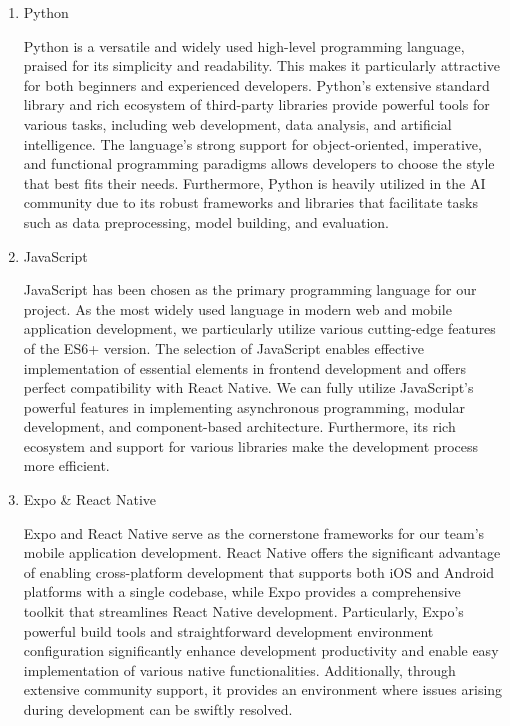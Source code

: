 \documentclass[conference]{IEEEtran}
\begin{document}
\begin{enumerate}[label=\arabic*]
    \begin{enumerate}[label=\arabic*)]
        \item Python\par
        \vspace{0.3em}
        Python is a versatile and widely used high-level programming language, praised for its simplicity and readability. This makes it particularly attractive for both beginners and experienced developers. Python’s extensive standard library and rich ecosystem of third-party libraries provide powerful tools for various tasks, including web development, data analysis, and artificial intelligence. The language’s strong support for object-oriented, imperative, and functional programming paradigms allows developers to choose the style that best fits their needs. Furthermore, Python is heavily utilized in the AI community due to its robust frameworks and libraries that facilitate tasks such as data preprocessing, model building, and evaluation.

        \vspace{1em}

        \item JavaScript\par
        \vspace{0.3em}
        JavaScript has been chosen as the primary programming language for our project. As the most widely used language in modern web and mobile application development, we particularly utilize various cutting-edge features of the ES6+ version. The selection of JavaScript enables effective implementation of essential elements in frontend development and offers perfect compatibility with React Native. We can fully utilize JavaScript's powerful features in implementing asynchronous programming, modular development, and component-based architecture. Furthermore, its rich ecosystem and support for various libraries make the development process more efficient.

        \vspace{1em}

        \item Expo \& React Native\par
        \vspace{0.3em}
        Expo and React Native serve as the cornerstone frameworks for our team's mobile application development. React Native offers the significant advantage of enabling cross-platform development that supports both iOS and Android platforms with a single codebase, while Expo provides a comprehensive toolkit that streamlines React Native development. Particularly, Expo's powerful build tools and straightforward development environment configuration significantly enhance development productivity and enable easy implementation of various native functionalities. Additionally, through extensive community support, it provides an environment where issues arising during development can be swiftly resolved.


\end{enumerate}
\end{enumerate}
\end{document}
